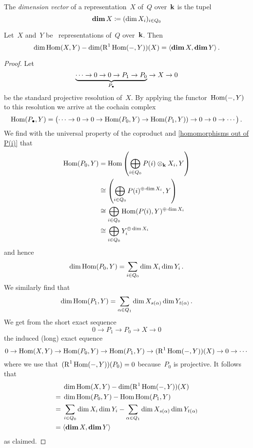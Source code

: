 \begin{definition*}
  The \emph{dimension vector} of a {\fd} representation~$X$ of~$Q$ over~$\mathbf{k}$ is the tupel
  \[
    \mathop{\mathbf{dim}} X
    \coloneqq
    (\dim X_i)_{i \in Q_0}
  \]
\end{definition*}


\begin{corollary}
  Let~$X$ and~$Y$ be~{\fd} representations of~$Q$ over~$\mathbf{k}$.
  Then
  \[
    \dim \operatorname{Hom}(X,Y)
    -
    \dim (\operatorname{R}^1 \operatorname{Hom}(-,Y))(X)
    =
    \langle\mathop{\mathbf{dim}} X, \mathop{\mathbf{dim}} Y\rangle  \,.
  \]
\end{corollary}


\begin{proof}
  Let
  \[
    \underbrace{
    \dotsb
    \to
    0
    \to
    0
    \to
    P_1
    \to
    P_0
    }_{P_\bullet}
    \to
    X
    \to
    0
  \]
  be the standard projective resolution of~$X$.
  By applying the functor~$\operatorname{Hom}(-,Y)$ to this resolution we arrive at the cochain complex
  \[
    \operatorname{Hom}(P_\bullet, Y)
    =
    \bigl(
      \dotsb
      \to
      0
      \to
      0
      \to
      \operatorname{Hom}(P_0, Y)
      \to
      \operatorname{Hom}(P_1, Y))
      \to
      0
      \to
      0
      \to
      \dotsb
    \bigr)  \,.
  \]
  We find with the universal property of the coproduct and \cref{homomorphisms out of P(i)} that
  \begin{align*}
    \operatorname{Hom}(P_0, Y)
    &=
    \operatorname{Hom}
    \left(
      \bigoplus_{i \in Q_0}
      P(i) \otimes_{\mathbf{k}} X_i,
      Y
    \right)
    \\
    &\cong
    \left(
      \bigoplus_{i \in Q_0}
      P(i)^{\oplus \dim X_i},
      Y
    \right)
    \\
    &\cong
    \bigoplus_{i \in Q_0}
    \operatorname{Hom}( P(i), Y )^{\oplus \dim X_i}
    \\
    &\cong
    \bigoplus_{i \in Q_0}
    Y_i^{\oplus \dim X_i}
  \end{align*}
  and hence
  \[
    \dim \operatorname{Hom}(P_0, Y)
    =
    \sum_{i \in Q_0} \dim X_i \dim Y_i  \,.
  \]
  We similarly find that
  \[
    \dim \operatorname{Hom}(P_1, Y)
    =
    \sum_{\alpha \in Q_1}
    \dim X_{s(\alpha)} \dim Y_{t(\alpha)} \,.
  \]
  We get from the short exact sequence
  \[
    0
    \to
    P_1
    \to
    P_0
    \to
    X
    \to
    0
  \]
  the induced (long) exact equence
  \[
    0
    \to
    \operatorname{Hom}(X,Y)
    \to
    \operatorname{Hom}(P_0,Y)
    \to
    \operatorname{Hom}(P_1,Y)
    \to
    (\operatorname{R}^1 \operatorname{Hom}(-,Y))(X)
    \to
    0
    \to
    \dotsb
  \]
  where we use that~$(\operatorname{R}^1 \operatorname{Hom}(-,Y))(P_0) = 0$ because~$P_0$ is projective.
  It follows that
  \begin{align*}
    {}&
      \dim \operatorname{Hom}(X,Y)
    - \dim (\operatorname{R}^1 \operatorname{Hom}(-,Y))(X)
    \\
    ={}&
      \dim \operatorname{Hom}(P_0, Y)
    - \operatorname{Hom} \operatorname{Hom}(P_1, Y)
    \\
    ={}&
      \sum_{i \in Q_0} \dim X_i \dim Y_i
    - \sum_{\alpha \in Q_1} \dim X_{s(\alpha)} \dim Y_{t(\alpha)}
    \\
    ={}&
      \langle \mathop{\mathbf{dim}} X, \mathop{\mathbf{dim}} Y \rangle
  \end{align*}
  as claimed.
\end{proof}









